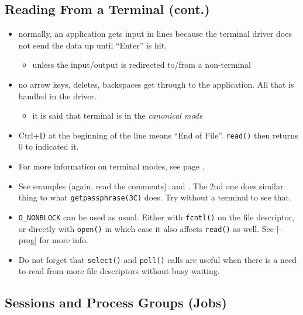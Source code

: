 \subsection{Reading From a Terminal (cont.)}

\begin{itemize}
\item normally, an application gets input in lines because the terminal driver
does not send the data up until ``Enter'' is hit.
\begin{itemize}
	\item unless the input/output is redirected to/from a non-terminal
\end{itemize}
\item no arrow keys, deletes, backspaces get through to the application. All
that is handled in the driver.
\begin{itemize}
	\item it is said that terminal is in the \emph{canonical mode}
\end{itemize}
\item Ctrl+D at the beginning of the line means ``End of File''. \texttt{read()}
then returns 0 to indicated it.
\end{itemize}

\begin{itemize}
\item For more information on terminal modes, see page \pageref{CANONICAL}.
\item See examples (again, read the comments):
 and
. The 2nd one does similar thing to what
\texttt{getpassphrase(3C)} does. Try without a terminal to see that.
\item \texttt{O\_NONBLOCK} can be used as usual. Either with \texttt{fcntl()} on
the file descriptor, or directly with \texttt{open()} in which case it also
affects \texttt{read()} as well. See [\myun\myix-prog] for more info.
\item Do not forget that \texttt{select()} and \texttt{poll()} calls are useful
when there is a need to read from more file descriptors without busy waiting.
\end{itemize}

\subsection{Sessions and Process Groups (Jobs)}

